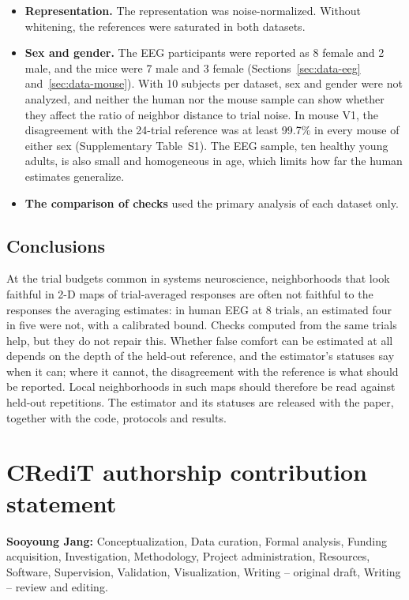 \documentclass[11pt]{article}
\newcommand{\MouseMale}{7}
\newcommand{\MouseFemale}{3}
\newcommand{\MouseDminSubject}{99.7}
\begin{document}
\begin{itemize}[leftmargin=*]
  The simulation study and the reporting classes were specified after the first results had been seen.
  The mouse data are the independent test of the pre-specified claims.
  \item \textbf{Representation.} The representation was noise-normalized.
  Without whitening, the references were saturated in both datasets.
  \item \textbf{Sex and gender.} The EEG participants were reported as 8 female and 2 male, and the mice were \MouseMale{} male and \MouseFemale{} female (Sections~\ref{sec:data-eeg} and~\ref{sec:data-mouse}).
  With 10 subjects per dataset, sex and gender were not analyzed, and neither the human nor the mouse sample can show whether they affect the ratio of neighbor distance to trial noise.
  In mouse V1, the disagreement with the 24-trial reference was at least \MouseDminSubject\% in every mouse of either sex (Supplementary Table~S1).
  The EEG sample, ten healthy young adults, is also small and homogeneous in age, which limits how far the human estimates generalize.
  \item \textbf{The comparison of checks} used the primary analysis of each dataset only.
\end{itemize}

\subsection{Conclusions}

At the trial budgets common in systems neuroscience, neighborhoods that look faithful in 2-D maps of trial-averaged responses are often not faithful to the responses the averaging estimates: in human EEG at 8 trials, an estimated four in five were not, with a calibrated bound.
Checks computed from the same trials help, but they do not repair this.
Whether false comfort can be estimated at all depends on the depth of the held-out reference, and the estimator's statuses say when it can; where it cannot, the disagreement with the reference is what should be reported.
Local neighborhoods in such maps should therefore be read against held-out repetitions.
The estimator and its statuses are released with the paper, together with the code, protocols and results.

\section*{CRediT authorship contribution statement}
\textbf{Sooyoung Jang:} Conceptualization, Data curation, Formal analysis, Funding acquisition, Investigation, Methodology, Project administration, Resources, Software, Supervision, Validation, Visualization, Writing -- original draft, Writing -- review and editing.
\end{document}
